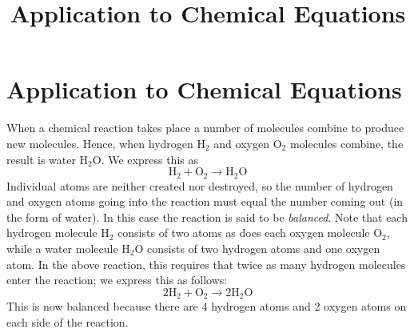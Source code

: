 \documentclass{ximera}
\title{Application to Chemical Equations} \license{CC BY-NC-SA 4.0}
\begin{document}
\begin{abstract}

\end{abstract}
\maketitle

\section*{Application to Chemical Equations}
When a chemical reaction takes place a number of molecules combine to produce new molecules. Hence, when hydrogen $\mbox{H}_2$ and oxygen $\mbox{O}_2$ molecules combine, the result is water $\mbox{H}_2\mbox{O}$. We express this as
\begin{equation*}
\mbox{H}_2 + \mbox{O}_2 \rightarrow \mbox{H}_2\mbox{O}
\end{equation*}
Individual atoms are neither created nor destroyed, so the number of hydrogen and oxygen atoms going into the reaction must equal the number coming out (in the form of water). In
this case the reaction is said to be \textit{balanced}. Note that each hydrogen molecule $\mbox{H}_2$ consists of two atoms as does each oxygen molecule $\mbox{O}_2$, while a water molecule $\mbox{H}_2\mbox{O}$ consists of two hydrogen atoms and one oxygen atom. In the above reaction, this requires that twice as many hydrogen molecules enter the reaction; we express this as follows:
\begin{equation*}
2\mbox{H}_2 + \mbox{O}_2 \rightarrow 2\mbox{H}_2\mbox{O}
\end{equation*}
This is now balanced because there are 4 hydrogen atoms and 2 oxygen atoms on each side of the reaction.
\end{document}
